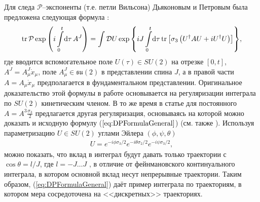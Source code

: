 
Для следа $\mathcal{P}$--экспоненты (т.е. петли Вильсона) Дьяконовым и Петровым была предложена следующая формула \cite{Diakonov1989}:
\begin{align}
	\label{eq:DPFormulaGeneral}
	\mathrm{tr}\, \mathcal{P} \exp{\left(i\int\limits_0^t\!\mathrm{d}\tau\, A^J \right)}=\int\mathcal{D}U\exp{\left\{ iJ\int\limits_0^t\! \mathrm{d}\tau \, \mathrm{tr}\left[ \sigma_3 \left( U^\dagger A U + i U^\dagger U \right) \right]\right\}},
\end{align}
где вводится вспомогательное поле $U(\tau)\in SU(2)$ на отрезке $[0,t]$, $A^J=A^J_\mu\dot{x}_\mu$, поле $A_\mu^J\in \mathfrak{su}(2)$ в представлении спина $J$, а в правой части $A=A_\mu\dot{x}_\mu$ предполагается в фундаментальном представлении. Оригинальное доказательство этой формулы в работе \cite{Diakonov1989} основывается на регуляризации интеграла по $SU(2)$ кинетическим членом. В то же время в статье \cite{Alekseev1988} для постоянного $A=A^3 \frac{\sigma_3}{2}$ предлагается другая регуляризация, основываясь на которой можно доказать и исходную формулу ($\ref{eq:DPFormulaGeneral}$) (см. также \cite{Mnev}). Используя параметризацию $U\in SU(2)$ углами Эйлера $(\phi, \psi, \theta)$ 
\begin{align}
	\label{eq:EulerAngles}
	U=e^{-i \phi \sigma_3/2}e^{-i \theta \sigma_2/2}e^{-i \psi \sigma_3/2},
\end{align}
можно показать, что вклад в интеграл будут давать только траектории с $\cos{\theta}=l/J$, где $l=-J\dots J$ \cite{Mnev}, в отличие от фейнмановского континуального интеграла, в котором основной вклад несут непрерывные траектории. Таким образом, (\ref{eq:DPFormulaGeneral}) даёт пример интеграла по траекториям, в котором мера сосредоточена на <<дискретных>> траекториях.